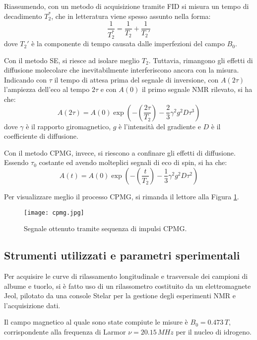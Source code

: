Riassumendo, con un metodo di acquisizione tramite FID si misura un tempo di decadimento $T_2^*$, che in letteratura viene spesso assunto nella forma:
\begin{equation}
	\frac{1}{T_2^*} = \frac{1}{T_2} +\frac{1}{T_2'}
\end{equation}
dove $T_2'$ è la componente di tempo causata dalle imperfezioni del campo $B_0$.

Con il metodo SE, si riesce ad isolare meglio $T_2$. Tuttavia, rimangono gli effetti di diffusione molecolare che inevitabilmente interferiscono ancora con la misura. Indicando con $\tau$ il tempo di attesa prima del segnale di inversione, con $A(2\tau)$ l'ampiezza dell'eco al tempo $2\tau$ e con $A(0)$ il primo segnale NMR rilevato, si ha che:
\begin{equation}
	A(2\tau) = A(0)\exp\left(-\left(\frac{2\tau}{T_2}\right) - \frac{2}{3} \gamma^2 g^2 D \tau^3\right)
\end{equation}
dove $\gamma$ è il rapporto giromagnetico, $g$ è l'intensità del gradiente e $D$ è il coefficiente di diffusione.

Con il metodo CPMG, invece, si riescono a confinare gli effetti di diffusione. 
Essendo $\tau_0$ costante ed avendo molteplici segnali di eco di spin, si ha che:
\begin{equation}
	A(t) = A(0)\exp\left(-\left(\frac{t}{T_2}\right) - \frac{1}{3} \gamma^2 g^2 D \tau^2\right)
\end{equation}

Per visualizzare meglio il processo CPMG, si rimanda il lettore alla Figura \ref{fig:cpmg}.

\begin{figure}[h!]
\centering
\texttt{[image: cpmg.jpg]}
\caption{Segnale ottenuto tramite sequenza di impulsi CPMG.}
\label{fig:cpmg}
\end{figure}

\subsection*{Strumenti utilizzati e parametri sperimentali}

Per acquisire le curve di rilassamento longitudinale e trasversale dei campioni di albume e tuorlo, si è fatto uso di un rilassometro costituito da un elettromagnete Jeol, pilotato da una console Stelar per la gestione degli esperimenti NMR e l'acquisizione dati.

Il campo magnetico al quale sono state compiute le misure è $B_0 = 0.473\si{\,}{T}$, corrispondente alla frequenza di Larmor $\nu = 20.15\si{\,}{MHz}$ per il nucleo di idrogeno.

